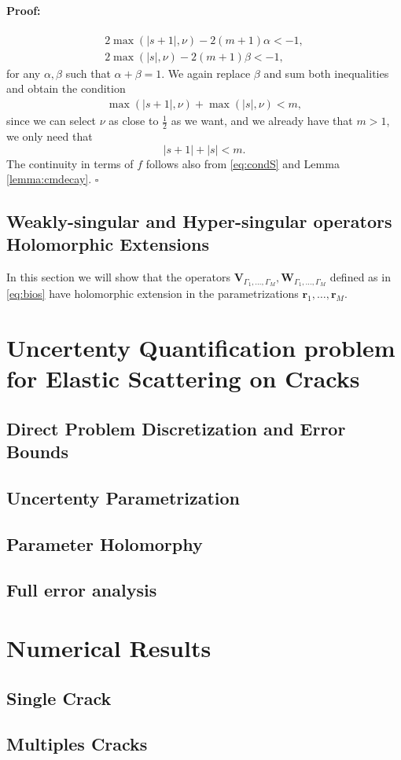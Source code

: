 \documentclass{article}
\newenvironment{proof}{\paragraph{Proof:}}{\hfill$\square$}
\newcommand{\br}{\bm{r}}
\begin{document}
\begin{proof}
\begin{align*}
2 \max(|s+1|, \nu ) - 2(m+1) \alpha < -1, \\ 
2 \max(|s|, \nu ) - 2(m+1) \beta < -1 ,
\end{align*}
for any $\alpha, \beta$ such that $\alpha + \beta =1$. We again replace $\beta$ and sum both inequalities and obtain the condition 
\begin{align*}
\max(|s+1|, \nu ) +\max(|s|, \nu )  < m ,
\end{align*}
since we can select $\nu$ as close to $\frac{1}{2}$ as we want, and we already have that $m > 1$, we only need that 
$$|s+1| + |s| < m. $$
The continuity in terms of $f$ follows also from \eqref{eq:condS} and Lemma   \ref{lemma:cmdecay}. 
\end{proof}


\subsection{Weakly-singular and Hyper-singular operators Holomorphic Extensions}
In this section we will show that the operators $\mathbf{V}_{\Gamma_1,\hdots,\Gamma_M}, \mathbf{W}_{\Gamma_1,\hdots,\Gamma_M}$ defined as in \eqref{eq:bios} have holomorphic extension in the parametrizations $\br_1,\hdots,\br_M$.

\section{Uncertenty Quantification problem for Elastic Scattering on Cracks}
\subsection{Direct Problem Discretization and Error Bounds}
\subsection{Uncertenty Parametrization}
\subsection{Parameter Holomorphy}
\subsection{Full error analysis}

\section{Numerical Results}
\subsection{Single Crack}
\subsection{Multiples Cracks}
\end{document}
